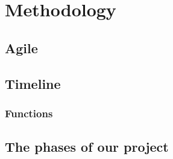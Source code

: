 
\chapter{Methodology} %

\label{ch:theory} %




\section{Agile}


\section{Timeline}\label{sec:options}
\subsection*{Functions}



\section{The phases of our project}\label{sec:custom}
